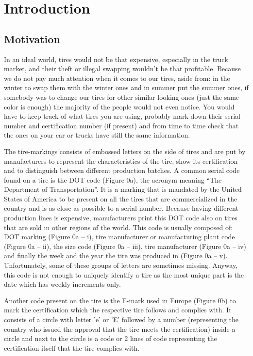 \chapter{Introduction}\pagestyle{fancy}\setlength{\parindent}{3em}
\label{chap:intro}

\section{Motivation}
\label{sec:motivation}

In an ideal world, tires would not be that expensive, especially in the truck market, and their theft or illegal swapping wouldn't be that profitable. Because we do not pay much attention when it comes to our tires, aside from: in the winter to swap them with the winter ones and in summer put the summer ones, if somebody was to change our tires for other similar looking ones (just the same color is enough) the majority of the people would not even notice. You would have to keep track of what tires you are using, probably mark down their serial number and certification number (if present) and from time to time check that the ones on your car or trucks have still the same information.

The tire-markings consists of embossed letters on the side of tires and are put by manufacturers to represent the characteristics of the tire, show its certification and to distinguish between different production batches. A common serial code found on a tire is the DOT code (Figure 0a), the acronym meaning “The Department of Transportation”. It is a marking that is mandated by the United States of America to be present on all the tires that are commercialized in the country and is as close as possible to a serial number. Because having different production lines is expensive, manufacturers print this DOT code also on tires that are sold in other regions of the world. This code is usually composed of: DOT marking (Figure 0a -- i), tire manufacturer or manufacturing plant code (Figure 0a -- ii), the size code (Figure 0a -- iii), tire manufacturer (Figure 0a -- iv) and finally the week and the year the tire was produced in (Figure 0a -- v). Unfortunately, some of these groups of letters are sometimes missing. Anyway, this code is not enough to uniquely identify a tire as the most unique part is the date which has weekly increments only.

Another code present on the tire is the E-mark used in Europe (Figure 0b) to mark the certification which the respective tire follows and complies with. It consists of a circle with letter 'e' or 'E' followed by a number (representing the country who issued the approval that the tire meets the certification) inside a circle and next to the circle is a code or 2 lines of code representing the certification itself that the tire complies with.

